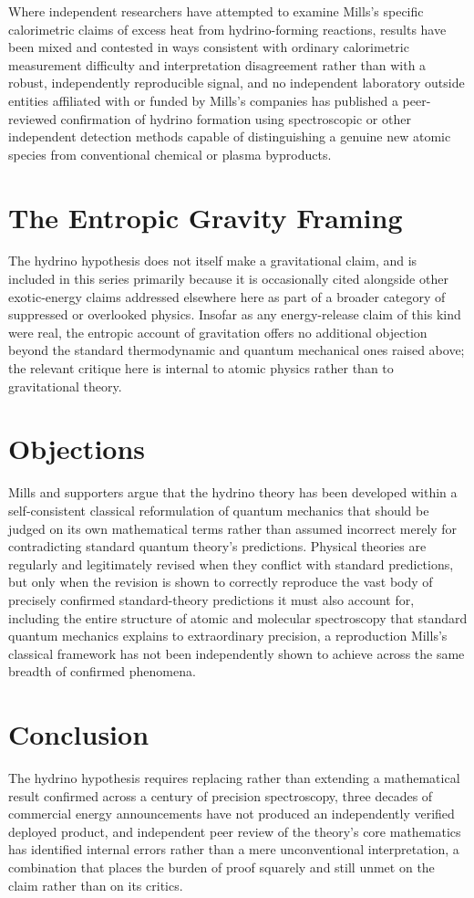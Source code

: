 \documentclass[11pt]{article}
\begin{document}
Where independent researchers have attempted to examine Mills's specific calorimetric claims of excess heat from hydrino-forming reactions, results have been mixed and contested in ways consistent with ordinary calorimetric measurement difficulty and interpretation disagreement rather than with a robust, independently reproducible signal, and no independent laboratory outside entities affiliated with or funded by Mills's companies has published a peer-reviewed confirmation of hydrino formation using spectroscopic or other independent detection methods capable of distinguishing a genuine new atomic species from conventional chemical or plasma byproducts.

\section{The Entropic Gravity Framing}

The hydrino hypothesis does not itself make a gravitational claim, and is included in this series primarily because it is occasionally cited alongside other exotic-energy claims addressed elsewhere here as part of a broader category of suppressed or overlooked physics. Insofar as any energy-release claim of this kind were real, the entropic account of gravitation offers no additional objection beyond the standard thermodynamic and quantum mechanical ones raised above; the relevant critique here is internal to atomic physics rather than to gravitational theory.

\section{Objections}

Mills and supporters argue that the hydrino theory has been developed within a self-consistent classical reformulation of quantum mechanics that should be judged on its own mathematical terms rather than assumed incorrect merely for contradicting standard quantum theory's predictions. Physical theories are regularly and legitimately revised when they conflict with standard predictions, but only when the revision is shown to correctly reproduce the vast body of precisely confirmed standard-theory predictions it must also account for, including the entire structure of atomic and molecular spectroscopy that standard quantum mechanics explains to extraordinary precision, a reproduction Mills's classical framework has not been independently shown to achieve across the same breadth of confirmed phenomena.

\section{Conclusion}

The hydrino hypothesis requires replacing rather than extending a mathematical result confirmed across a century of precision spectroscopy, three decades of commercial energy announcements have not produced an independently verified deployed product, and independent peer review of the theory's core mathematics has identified internal errors rather than a mere unconventional interpretation, a combination that places the burden of proof squarely and still unmet on the claim rather than on its critics.
\end{document}
